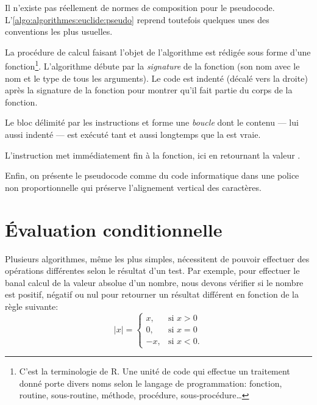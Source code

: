 
Il n'existe pas réellement de normes de composition pour le
pseudocode. L'\autoref{algo:algorithmes:euclide:pseudo} reprend
toutefois quelques unes des conventions les plus usuelles.

La procédure de calcul faisant l'objet de l'algorithme est rédigée
sous forme d'une fonction\footnote{%
  C'est la terminologie de R. Une unité de code qui effectue un
  traitement donné porte divers noms selon le langage de
  programmation: fonction, routine, sous-routine, méthode, procédure,
  sous-procédure\dots}. %
L'algorithme débute par la \emph{signature} de la
fonction (son nom avec le nom et le type de tous les arguments). Le
code est indenté (décalé vers la droite) après la
signature de la fonction pour montrer qu'il fait partie du corps de la
fonction.

Le bloc délimité par les instructions  et  forme une
\emph{boucle} dont le contenu --- lui aussi indenté ---
est exécuté tant et aussi longtemps que la  est vraie.

L'instruction  met immédiatement fin à la fonction,
ici en retournant la valeur .

Enfin, on présente le pseudocode comme du code informatique dans une
police non proportionnelle qui préserve l'alignement vertical des
caractères.


\section{Évaluation conditionnelle}
\label{sec:algorithmes:if-else}

Plusieurs algorithmes, même les plus simples, nécessitent de pouvoir
effectuer des opérations différentes selon le résultat d'un test. Par
exemple, pour effectuer le banal calcul de la valeur absolue d'un
nombre, nous devons vérifier si le nombre est positif, négatif ou nul
pour retourner un résultat différent en fonction de la règle suivante:
\begin{equation*}
  \lvert x \rvert =
  \begin{cases}
    x, & \text{si } x > 0 \\
    0, & \text{si } x = 0 \\
    -x, & \text{si } x < 0.
  \end{cases}
\end{equation*}

